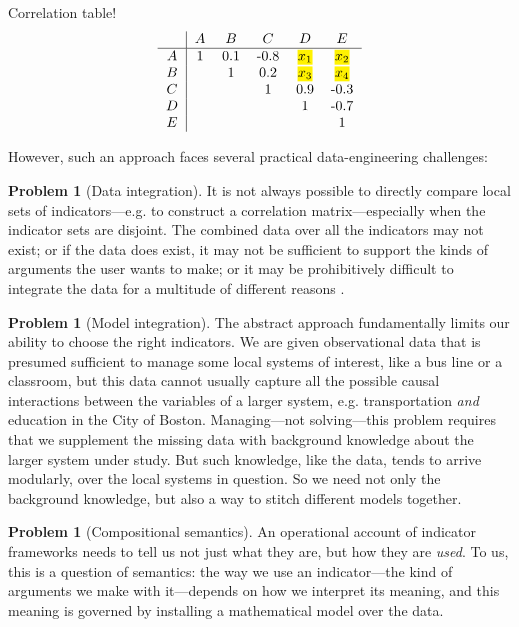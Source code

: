 \documentclass{article}
\theoremstyle{definition}
\newtheorem{problem}[theorem]{Problem}
\newcommand{\Cat}[1]{\mathsf{#1}}
\def\Rand{\Cat{Rand}}
\def\Caus{\Cat{Caus}}
\begin{document}
Correlation table!
\[
\begin{tabular}{c|ccccc}
		& $A$ & $B$ & $C$ & $D$ & $E$ \\ \hline
$A$		& 1 & 0.1 & -0.8 & \hl{$x_1$} & \hl{$x_2$} \\
$B$		& & 1 & 0.2 & \hl{$x_3$} & \hl{$x_4$} \\
$C$		& & & 1 & 0.9 & -0.3 \\
$D$		& & & & 1 & -0.7 \\
$E$		& & & & & 1
\end{tabular}
\]
 
However, such an approach faces several practical data-engineering challenges:
\begin{problem}[Data integration]
It is not always possible to directly compare local sets of indicators---e.g. to construct a correlation matrix---especially when the indicator sets are disjoint. The combined data over all the indicators may not exist; or if the data does exist, it may not be sufficient to support the kinds of arguments the user wants to make; or it may be prohibitively difficult to integrate the data for a multitude of different reasons \cite{halevy_integration_book?}.
\end{problem}
\begin{problem}[Model integration]
The abstract approach fundamentally limits our ability to choose the right indicators. We are given observational data that is presumed sufficient to manage some local systems of interest, like a bus line or a classroom, but this data cannot usually capture all the possible causal interactions between the variables of a larger system, e.g. transportation \emph{and} education in the City of Boston. Managing---not solving---this problem requires that we supplement the missing data with background knowledge about the larger system under study. But such knowledge, like the data, tends to arrive modularly, over the local systems in question. So we need not only the background knowledge, but also a way to stitch different models together. %
\end{problem}
\begin{problem}[Compositional semantics]
An operational account of indicator frameworks needs to tell us not just what they are, but how they are \emph{used}. To us, this is a question of semantics: the way we use an indicator---the kind of arguments we make with it---depends on how we interpret its meaning, and this meaning is governed by installing a mathematical model over the data. %
\end{problem}
\end{document}
